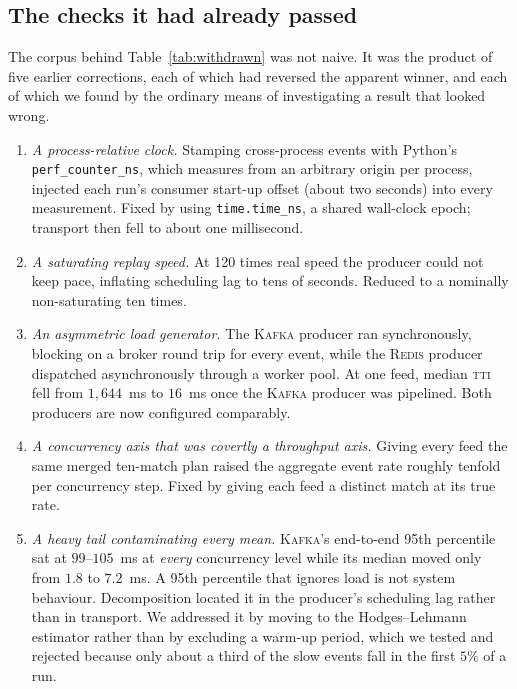 \documentclass[Afour,sageh,times]{sagej}
\newcommand{\redis}{\textsc{Redis}}
\newcommand{\kafka}{\textsc{Kafka}}
\newcommand{\tti}{\textsc{tti}}
\begin{document}
\subsection{The checks it had already passed}
\label{sec:defects}

The corpus behind Table~\ref{tab:withdrawn} was not naive. It was the product of five earlier
corrections, each of which had reversed the apparent winner, and each of which we found by the
ordinary means of investigating a result that looked wrong.

\begin{enumerate}
\item \emph{A process-relative clock.} Stamping cross-process events with Python's
\texttt{perf\_counter\_ns}, which measures from an arbitrary origin per process, injected each
run's consumer start-up offset (about two seconds) into every measurement. Fixed by using
\texttt{time.time\_ns}, a shared wall-clock epoch; transport then fell to about one millisecond.
\item \emph{A saturating replay speed.} At 120 times real speed the producer could not keep pace,
inflating scheduling lag to tens of seconds. Reduced to a nominally non-saturating ten times.
\item \emph{An asymmetric load generator.} The \kafka{} producer ran synchronously, blocking on a
broker round trip for every event, while the \redis{} producer dispatched asynchronously through
a worker pool. At one feed, median \tti{} fell from $1{,}644$~ms to $16$~ms once the \kafka{}
producer was pipelined. Both producers are now configured comparably.
\item \emph{A concurrency axis that was covertly a throughput axis.} Giving every feed the same
merged ten-match plan raised the aggregate event rate roughly tenfold per concurrency step. Fixed
by giving each feed a distinct match at its true rate.
\item \emph{A heavy tail contaminating every mean.} \kafka{}'s end-to-end 95th percentile sat at
$99$--$105$~ms at \emph{every} concurrency level while its median moved only from $1.8$ to
$7.2$~ms. A 95th percentile that ignores load is not system behaviour. Decomposition located it in
the producer's scheduling lag rather than in transport. We addressed it by moving to the
Hodges--Lehmann estimator rather than by excluding a warm-up period, which we tested and rejected
because only about a third of the slow events fall in the first $5\%$ of a run.
\end{enumerate}
\end{document}
